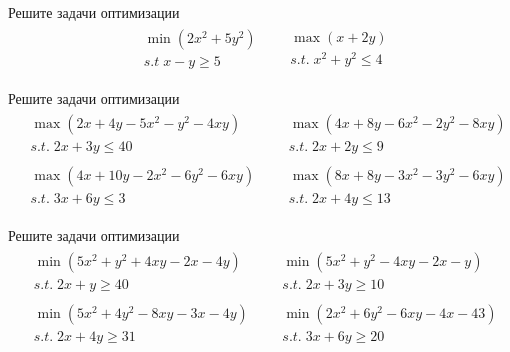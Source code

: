 
\begin{exercise}
Решите задачи оптимизации
\begin{align*}
	&\begin{gathered}
		\min(2x^2+5y^2) \\  s.t\; x-y\geq 5
	\end{gathered} &
	&\begin{gathered}
		\max (x+2y) \\ s.t.\; x^2+y^2\leq4
	\end{gathered}
\end{align*}
\end{exercise}

\begin{exercise}
Решите задачи оптимизации
\begin{align*}
	&\begin{gathered}
		\max(2x+4y-5x^2-y^2-4xy)\\ s.t.\; 2x+3y\leq 40
	\end{gathered} &
	&\begin{gathered}
		\max(4x+8y-6x^2-2y^2-8xy)\\ s.t.\; 2x+2y\leq 9
	\end{gathered} \\
	&\begin{gathered}
		\max(4x+10y-2x^2-6y^2-6xy)\\ s.t.\; 3x+6y\leq 3
	\end{gathered} &
	&\begin{gathered}
		\max(8x+8y-3x^2-3y^2-6xy)\\ s.t.\; 2x+4y\leq 13
	\end{gathered}
\end{align*}
\end{exercise}

\begin{exercise}
Решите задачи оптимизации
\begin{align*}
	&\begin{gathered}
		\min(5x^2+y^2+4xy-2x-4y)\\ s.t.\; 2x+y\geq 40
	\end{gathered} &
	&\begin{gathered}
		\min(5x^2+y^2-4xy-2x-y)\\ s.t.\; 2x+3y\geq 10
	\end{gathered} \\
	&\begin{gathered}
		\min(5x^2+4y^2-8xy-3x-4y)\\ s.t.\; 2x+4y\geq 31
	\end{gathered} &
	&\begin{gathered}
		\min(2x^2+6y^2-6xy-4x-43)\\ s.t.\; 3x+6y\geq 20
	\end{gathered}
\end{align*}
\end{exercise}

